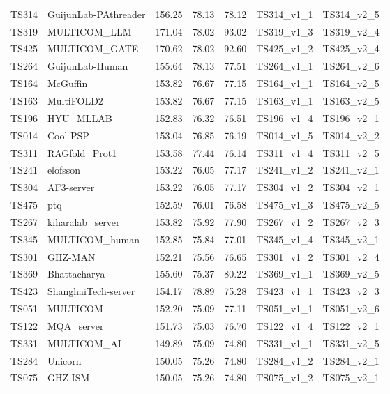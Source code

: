 \begin{longtable}{lllllll}
TS314 & GuijunLab-PAthreader & 156.25 & 78.13 & 78.12 & TS314\_v1\_1 & TS314\_v2\_5 \\ 
TS319 & MULTICOM\_LLM & 171.04 & 78.02 & 93.02 & TS319\_v1\_3 & TS319\_v2\_4 \\ 
TS425 & MULTICOM\_GATE & 170.62 & 78.02 & 92.60 & TS425\_v1\_2 & TS425\_v2\_4 \\ 
TS264 & GuijunLab-Human & 155.64 & 78.13 & 77.51 & TS264\_v1\_1 & TS264\_v2\_6 \\ 
TS164 & McGuffin & 153.82 & 76.67 & 77.15 & TS164\_v1\_1 & TS164\_v2\_5 \\ 
TS163 & MultiFOLD2 & 153.82 & 76.67 & 77.15 & TS163\_v1\_1 & TS163\_v2\_5 \\ 
TS196 & HYU\_MLLAB & 152.83 & 76.32 & 76.51 & TS196\_v1\_4 & TS196\_v2\_1 \\ 
TS014 & Cool-PSP & 153.04 & 76.85 & 76.19 & TS014\_v1\_5 & TS014\_v2\_2 \\ 
TS311 & RAGfold\_Prot1 & 153.58 & 77.44 & 76.14 & TS311\_v1\_4 & TS311\_v2\_5 \\ 
TS241 & elofsson & 153.22 & 76.05 & 77.17 & TS241\_v1\_2 & TS241\_v2\_1 \\ 
TS304 & AF3-server & 153.22 & 76.05 & 77.17 & TS304\_v1\_2 & TS304\_v2\_1 \\ 
TS475 & ptq & 152.59 & 76.01 & 76.58 & TS475\_v1\_3 & TS475\_v2\_5 \\ 
TS267 & kiharalab\_server & 153.82 & 75.92 & 77.90 & TS267\_v1\_2 & TS267\_v2\_3 \\ 
TS345 & MULTICOM\_human & 152.85 & 75.84 & 77.01 & TS345\_v1\_4 & TS345\_v2\_1 \\ 
TS301 & GHZ-MAN & 152.21 & 75.56 & 76.65 & TS301\_v1\_2 & TS301\_v2\_4 \\ 
TS369 & Bhattacharya & 155.60 & 75.37 & 80.22 & TS369\_v1\_1 & TS369\_v2\_5 \\ 
TS423 & ShanghaiTech-server & 154.17 & 78.89 & 75.28 & TS423\_v1\_1 & TS423\_v2\_3 \\ 
TS051 & MULTICOM & 152.20 & 75.09 & 77.11 & TS051\_v1\_1 & TS051\_v2\_6 \\ 
TS122 & MQA\_server & 151.73 & 75.03 & 76.70 & TS122\_v1\_4 & TS122\_v2\_1 \\ 
TS331 & MULTICOM\_AI & 149.89 & 75.09 & 74.80 & TS331\_v1\_1 & TS331\_v2\_5 \\ 
TS284 & Unicorn & 150.05 & 75.26 & 74.80 & TS284\_v1\_2 & TS284\_v2\_1 \\ 
TS075 & GHZ-ISM & 150.05 & 75.26 & 74.80 & TS075\_v1\_2 & TS075\_v2\_1 \\ 

\end{longtable}
